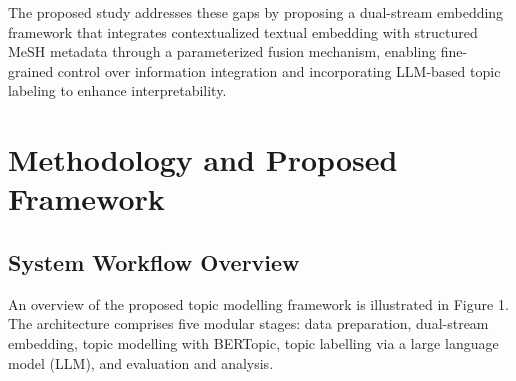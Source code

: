 \documentclass{ieeeaccess}
\begin{document}
The proposed study addresses these gaps by proposing a dual-stream embedding framework that integrates contextualized textual embedding with structured MeSH metadata through a parameterized fusion mechanism, enabling fine-grained control over information integration and incorporating LLM-based topic labeling to enhance interpretability.


\section{Methodology and Proposed Framework}
\subsection{System Workflow Overview}
An overview of the proposed topic modelling framework is illustrated in Figure 1. The architecture comprises five modular stages: data preparation, dual-stream embedding, topic modelling with BERTopic, topic labelling via a large language model (LLM), and evaluation and analysis.
\end{document}
